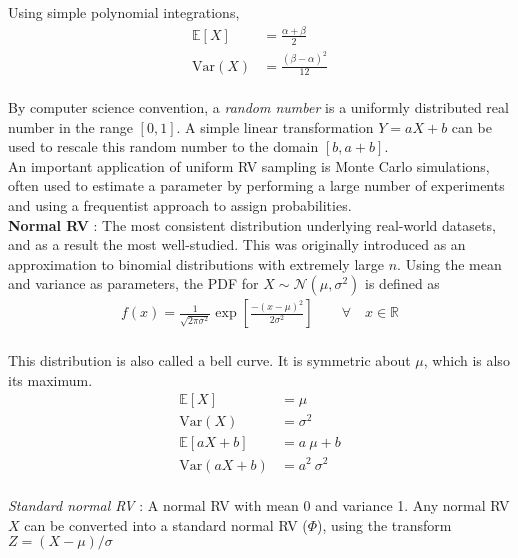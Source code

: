 Using simple polynomial integrations, \\

\begin{align}
	\mathbb{E}[X] &= \frac{\alpha + \beta}{2} \\[1ex]
	\mathrm{Var}(X) &= \frac{(\beta - \alpha)^2}{12} 
\end{align} \\


By computer science convention, a \textit{random number} is a uniformly distributed real number in the range $ [0, 1] $. A simple linear transformation $ Y = aX + b $ can be used to rescale this random number to the domain $ [b, a+b] $.\\

An important application of uniform RV sampling is Monte Carlo simulations, often used to estimate a parameter by performing a large number of experiments and using a frequentist approach to assign probabilities.\\

\textbf{Normal RV} : The most consistent distribution underlying real-world datasets, and as a result the most well-studied. This was originally introduced as an approximation to binomial distributions with extremely large $ n $. Using the mean and variance as parameters, the PDF for $ X \sim \mathcal{N}(\mu, \sigma^2) $ is defined as \\

\begin{align}
	f(x) = \frac{1}{\sqrt{2 \pi \sigma^2}} \exp \left[\frac{- (x - \mu)^2}{2\sigma^2}\right] \qquad \forall \quad x \in \mathbb{R}
\end{align}\\

This distribution is also called a bell curve. It is symmetric about $ \mu $, which is also its maximum. \\

\begin{align}
	\mathbb{E}[X] &= \mu \\[1ex]
	\mathrm{Var}(X) &= \sigma^2
	 \\[1ex]
	\mathbb{E}[aX + b] &= a\ \mu + b \nonumber \\[1ex]
	\mathrm{Var}(aX + b) &= a^2 \ \sigma^2 \nonumber 
\end{align} \\

\textit{Standard normal RV} : A normal RV with mean 0 and variance 1. Any normal RV $ X $ can be converted into a standard normal RV ($ \Phi $), using the transform $ Z = (X - \mu) / \sigma$\\

